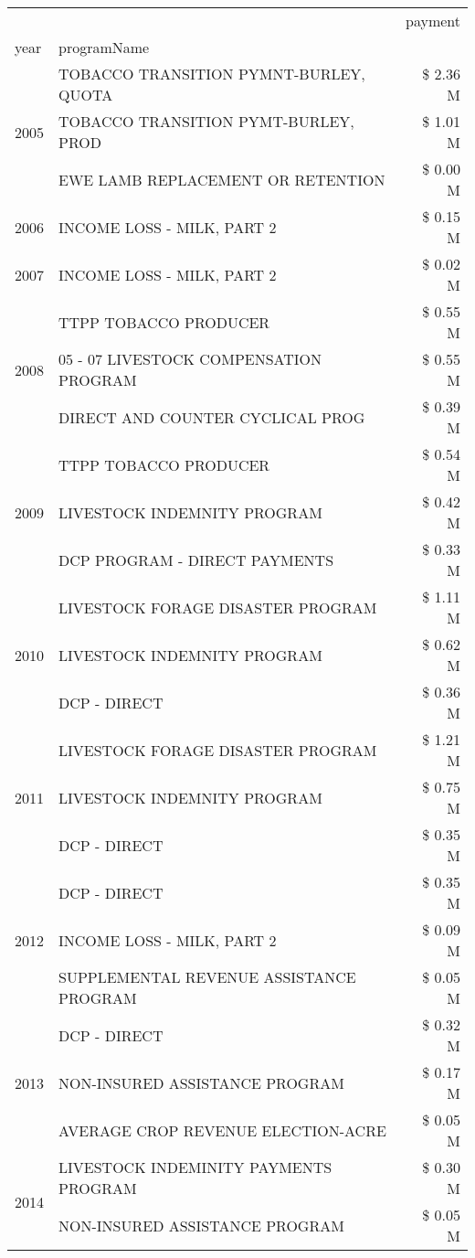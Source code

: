 \begin{tabular}{llr}
\toprule
 &  & payment \\
year & programName &  \\
\midrule
\multirow[t]{3}{*}{2005} & TOBACCO TRANSITION PYMNT-BURLEY, QUOTA & \$ 2.36 M \\
 & TOBACCO TRANSITION PYMT-BURLEY, PROD & \$ 1.01 M \\
 & EWE LAMB REPLACEMENT OR RETENTION & \$ 0.00 M \\
\cline{1-3}
2006 & INCOME LOSS - MILK, PART 2 & \$ 0.15 M \\
\cline{1-3}
2007 & INCOME LOSS - MILK, PART 2 & \$ 0.02 M \\
\cline{1-3}
\multirow[t]{3}{*}{2008} & TTPP TOBACCO PRODUCER & \$ 0.55 M \\
 & 05 - 07 LIVESTOCK COMPENSATION PROGRAM & \$ 0.55 M \\
 & DIRECT AND COUNTER CYCLICAL PROG & \$ 0.39 M \\
\cline{1-3}
\multirow[t]{3}{*}{2009} & TTPP TOBACCO PRODUCER & \$ 0.54 M \\
 & LIVESTOCK INDEMNITY PROGRAM & \$ 0.42 M \\
 & DCP PROGRAM - DIRECT PAYMENTS & \$ 0.33 M \\
\cline{1-3}
\multirow[t]{3}{*}{2010} & LIVESTOCK FORAGE DISASTER PROGRAM & \$ 1.11 M \\
 & LIVESTOCK INDEMNITY PROGRAM & \$ 0.62 M \\
 & DCP - DIRECT & \$ 0.36 M \\
\cline{1-3}
\multirow[t]{3}{*}{2011} & LIVESTOCK FORAGE DISASTER PROGRAM & \$ 1.21 M \\
 & LIVESTOCK INDEMNITY PROGRAM & \$ 0.75 M \\
 & DCP - DIRECT & \$ 0.35 M \\
\cline{1-3}
\multirow[t]{3}{*}{2012} & DCP - DIRECT & \$ 0.35 M \\
 & INCOME LOSS - MILK, PART 2 & \$ 0.09 M \\
 & SUPPLEMENTAL REVENUE ASSISTANCE PROGRAM & \$ 0.05 M \\
\cline{1-3}
\multirow[t]{3}{*}{2013} & DCP - DIRECT & \$ 0.32 M \\
 & NON-INSURED ASSISTANCE PROGRAM & \$ 0.17 M \\
 & AVERAGE CROP REVENUE ELECTION-ACRE & \$ 0.05 M \\
\cline{1-3}
\multirow[t]{3}{*}{2014} & LIVESTOCK INDEMINITY PAYMENTS PROGRAM & \$ 0.30 M \\
 & NON-INSURED ASSISTANCE PROGRAM & \$ 0.05 M \\

\end{tabular}
